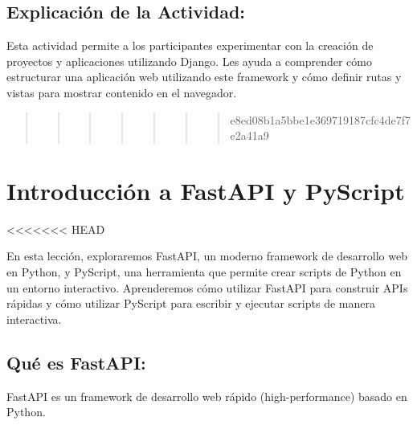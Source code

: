 \documentclass[
  a4paper,
  onepage,
  openany]{scrreprt}
\begin{document}
\hypertarget{explicaciuxf3n-de-la-actividad-81}{%
\section{Explicación de la
Actividad:}\label{explicaciuxf3n-de-la-actividad-81}}

Esta actividad permite a los participantes experimentar con la creación
de proyectos y aplicaciones utilizando Django. Les ayuda a comprender
cómo estructurar una aplicación web utilizando este framework y cómo
definir rutas y vistas para mostrar contenido en el navegador.

\begin{quote}
\begin{quote}
\begin{quote}
\begin{quote}
\begin{quote}
\begin{quote}
\begin{quote}
e8ed08b1a5bbe1e369719187cfc4de7f7e2a41a9
\end{quote}
\end{quote}
\end{quote}
\end{quote}
\end{quote}
\end{quote}
\end{quote}

\hypertarget{introducciuxf3n-a-fastapi-y-pyscript}{%
\chapter{Introducción a FastAPI y
PyScript}\label{introducciuxf3n-a-fastapi-y-pyscript}}

\textless\textless\textless\textless\textless\textless\textless{} HEAD

En esta lección, exploraremos FastAPI, un moderno framework de
desarrollo web en Python, y PyScript, una herramienta que permite crear
scripts de Python en un entorno interactivo. Aprenderemos cómo utilizar
FastAPI para construir APIs rápidas y cómo utilizar PyScript para
escribir y ejecutar scripts de manera interactiva.

\hypertarget{quuxe9-es-fastapi}{%
\section{Qué es FastAPI:}\label{quuxe9-es-fastapi}}

FastAPI es un framework de desarrollo web rápido (high-performance)
basado en Python.
\end{document}
